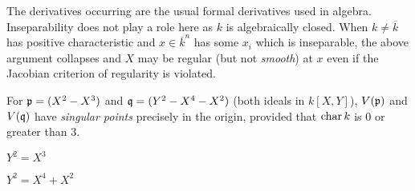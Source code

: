 \documentclass[a4paper,parskip=half,numbers=enddot, DIV=12]{scrreprt}
\begin{document}
\begin{rem*}
    The derivatives occurring are the usual formal derivatives used in algebra. Inseparability does not play a role here as $k$ is algebraically closed. When $k\neq \overline{k}$ has positive characteristic and $x\in \overline{k}^n$ has some $x_i$ which is inseparable, the above argument collapses and $X$ may be regular (but not \emph{smooth}) at $x$ even if the Jacobian criterion of regularity is violated.
\end{rem*}
\begin{example*}
    For $\mathfrak{p}= (X^2-X^3)$ and $\mathfrak{q} = (Y^2-X^4-X^2)$ (both ideals in $k[X,Y]$), $V(\mathfrak{p})$ and $V(\mathfrak{q})$ have \emph{singular points} precisely in the origin, provided that $\operatorname{char} k$ is 0 or greater than 3.
\end{example*}
\begin{center}
	\begin{minipage}{0.42\textwidth}
		\centering
		
		$Y^2=X^3$
	\end{minipage}
	\begin{minipage}{0.42\textwidth}
		\centering
		
		$Y^2=X^4+X^2$
	\end{minipage}
\end{center}
\end{document}

